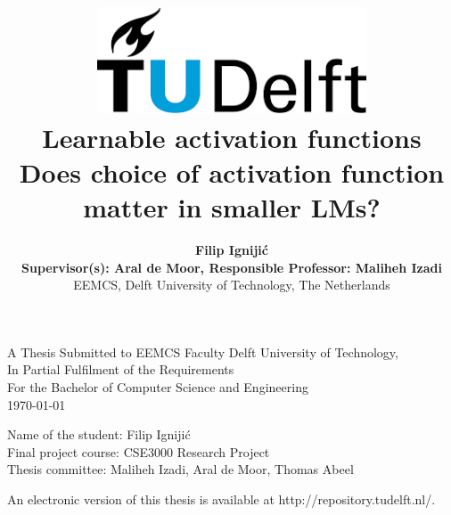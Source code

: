 \title{
    \includegraphics[width=8cm, keepaspectratio]{tudelftlogo.png}\\
    \vspace*{2cm}
    \textbf{
         Learnable activation functions\\
        {\large Does choice of activation function matter in smaller LMs?}
    }\\
    \vspace*{1cm}
}

\author{
     \textbf{Filip Ignijić}\\
    \hfill \break
    \textbf{Supervisor(s): Aral de Moor, Responsible Professor: Maliheh Izadi}\\
    \break
    {\large 
        \hfill \break
        EEMCS, Delft University of Technology, The Netherlands
    }\\
}

\date{}

\maketitle
\thispagestyle{empty}

\let\clearpagebackup\clearpage
\renewcommand{\clearpage}{ }

\onecolumn

\vspace*{1.5cm}
\begin{center}
    A Thesis Submitted to EEMCS Faculty Delft University of Technology,\\
    In Partial Fulfilment of the Requirements\\
    For the Bachelor of Computer Science and Engineering\\
    \today
\end{center}

\vspace*{2cm}

\noindent
{\small
Name of the student: Filip Ignijić\\
Final project course: CSE3000 Research Project\\
Thesis committee: Maliheh Izadi, Aral de Moor, Thomas Abeel \\
}
\vfill

\begin{center}
    An electronic version of this thesis is available at http://repository.tudelft.nl/.
\end{center}

\twocolumn
\let\clearpage\clearpagebackup  
\clearpage
\setcounter{page}{1}
